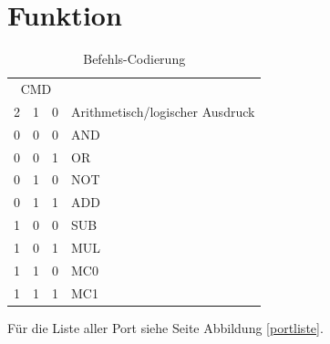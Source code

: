 \documentclass[11pt]{report}
\begin{document}
	\section{Funktion}
	\begin{table}[h]
		\centering
		\label{codierungstabelle}
		\begin{tabular}{|lll|l|}
			\hline
			\multicolumn{3}{|c|}{CMD}                            & \multicolumn{1}{c|}{}             \\
			\multicolumn{1}{|l|}{2} & \multicolumn{1}{l|}{1} & 0 & Arithmetisch/logischer Ausdruck \\ \hline
			0                       & 0                      & 0 & AND                               \\ \hline
			0                       & 0                      & 1 & OR                                \\ \hline
			0                       & 1                      & 0 & NOT                               \\ \hline
			0                       & 1                      & 1 & ADD                               \\ \hline
			1                       & 0                      & 0 & SUB                               \\ \hline
			1                       & 0                      & 1 & MUL                               \\ \hline
			1                       & 1                      & 0 & MC0                               \\ \hline
			1                       & 1                      & 1 & MC1                               \\ \hline
		\end{tabular}
		\caption{Befehls-Codierung}
	\end{table}
	\FloatBarrier
	Für die Liste aller Port siehe Seite \pageref{portliste} Abbildung \ref{portliste}.\\
\end{document}
